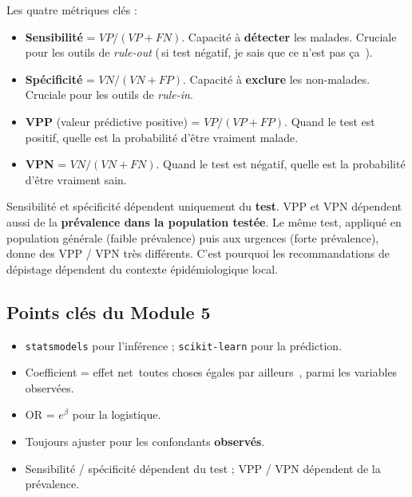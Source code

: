 \documentclass[11pt,a4paper]{article}
\providecommand{\og}{\guillemotleft\,}
\providecommand{\fg}{\,\guillemotright}
\begin{document}
Les quatre m\'etriques cl\'es :

\begin{itemize}
  \item \textbf{Sensibilit\'e} = $VP / (VP+FN)$. Capacit\'e \`a
        \textbf{d\'etecter} les malades. Cruciale pour les outils de
        \emph{rule-out} (\og si test n\'egatif, je sais que ce n'est pas
        \c{c}a \fg{}).
  \item \textbf{Sp\'ecificit\'e} = $VN / (VN+FP)$. Capacit\'e \`a
        \textbf{exclure} les non-malades. Cruciale pour les outils de
        \emph{rule-in}.
  \item \textbf{VPP} (valeur pr\'edictive positive) = $VP / (VP+FP)$.
        Quand le test est positif, quelle est la probabilit\'e d'\^etre
        vraiment malade.
  \item \textbf{VPN} = $VN / (VN+FN)$. Quand le test est n\'egatif,
        quelle est la probabilit\'e d'\^etre vraiment sain.
\end{itemize}

\begin{clinique}
Sensibilit\'e et sp\'ecificit\'e d\'ependent uniquement du \textbf{test}.
VPP et VPN d\'ependent aussi de la \textbf{pr\'evalence dans la
population test\'ee}. Le m\^eme test, appliqu\'e en population
g\'en\'erale (faible pr\'evalence) puis aux urgences (forte
pr\'evalence), donne des VPP / VPN tr\`es diff\'erents. C'est pourquoi
les recommandations de d\'epistage d\'ependent du contexte
\'epid\'emiologique local.
\end{clinique}

\subsection{Points cl\'es du Module 5}

\begin{itemize}
  \item \texttt{statsmodels} pour l'inf\'erence ; \texttt{scikit-learn}
        pour la pr\'ediction.
  \item Coefficient = effet net \og toutes choses \'egales par
        ailleurs \fg{}, parmi les variables observ\'ees.
  \item OR = $e^{\beta}$ pour la logistique.
  \item Toujours ajuster pour les confondants \textbf{observ\'es}.
  \item Sensibilit\'e / sp\'ecificit\'e d\'ependent du test ; VPP / VPN
        d\'ependent de la pr\'evalence.
\end{itemize}
\end{document}
